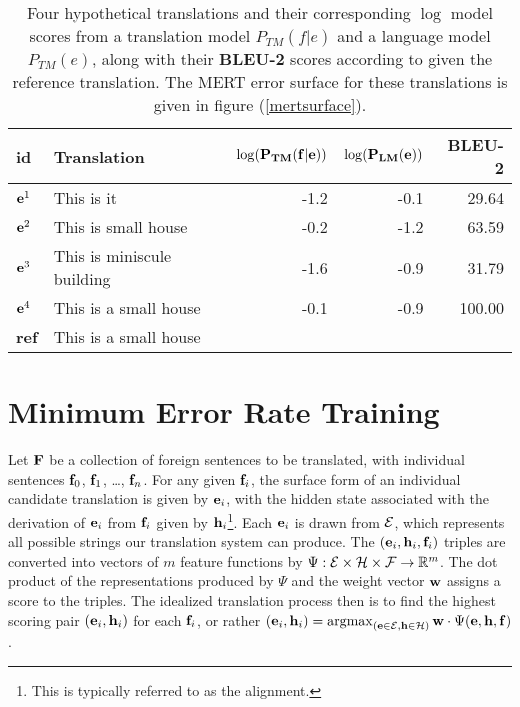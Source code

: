 \documentclass[11pt]{article}
\DeclareMathOperator*{\argmax}{argmax}
\begin{document}
\begin{table*}
\begin{center}
\begin{tabular}{|l|lrrr|}
\hline \bf id & \bf Translation  & \mbox{$\bf \log(P_{TM}(f|e))$}  & \mbox{$\bf \log(P_{LM}(e))$} & {\bf BLEU-2} \\
\hline
\mbox{${\bf e}^1$} & This is it  & -1.2 & -0.1 & 29.64 \\
\mbox{${\bf e}^2$} & This is small house   & -0.2 & -1.2 & 63.59 \\
\mbox{${\bf e}^3$} & This is miniscule building   & -1.6 & -0.9 & 31.79  \\
\mbox{${\bf e}^4$} & This is a small house   & -0.1 & -0.9 & 100.00  \\
\hline
{\bf ref}  & This is a small house & & & \\
\hline
\end{tabular}
\end{center}
\caption{
\label{hscores}
Four hypothetical translations and their corresponding \mbox{$\log$} model scores from a translation model \mbox{$P_{TM}(f|e)$} and a language model \mbox{$P_{TM}(e)$}, along with their {\bf BLEU-2} scores according to given the reference translation. The MERT error surface for these translations is given in figure (\ref{mertsurface}).}
\end{table*}

\section{Minimum Error Rate Training}

Let \mbox{${\bf F}$} be a collection of foreign sentences to be translated, with individual sentences \mbox{${\bf f}_0$}, \mbox{${\bf f}_1$}, \ldots, \mbox{${\bf f}_n$}. For any given \mbox{${\bf f}_i$}, the surface form of an individual candidate translation is given by \mbox{${\bf e}_i$}, with the hidden state associated with the derivation of \mbox{${\bf e}_i$} from \mbox{${\bf f}_i$} given by \mbox{${\bf h}_i$}\footnote{This is typically referred to as the alignment.}. Each \mbox{${\bf e}_i$} is drawn from \mbox{${\cal E}$}, which represents all possible strings our translation system can produce. The \mbox{$({\bf e}_i, {\bf h}_i, {\bf f}_i)$} triples are converted into vectors of \mbox{$m$} feature functions by \mbox{${\Psi }:{\cal E}\times{\cal H}\times{\cal F} \rightarrow \mathbb{R}^m$}. The dot product of the representations produced by \mbox{${\Psi}$} and the weight vector \mbox{${\bf w}$} assigns a score to the triples. The idealized translation process then is to find the highest scoring pair \mbox{$({\bf e}_i, {\bf h}_i)$} for each \mbox{${\bf f}_i$}, or rather \mbox{$({\bf e}_i, {\bf h}_i) = \argmax_{({\bf e} \in {\cal E}, {\bf h} \in {\cal H})} {\bf w} \cdot \Psi({\bf e}, {\bf h}, {\bf f})$}. 
\end{document}
